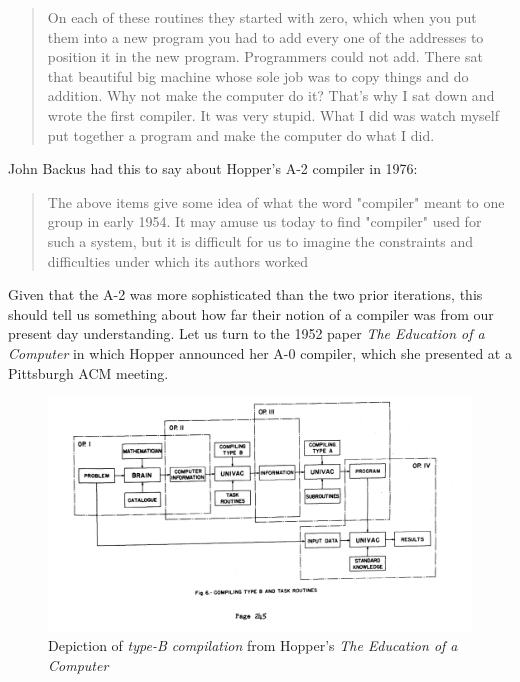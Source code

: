 \begin{quotation}
	On each of these routines they started with zero, which when you put them into
	a new program you had to add every one of the addresses to position it in the
	new program. Programmers could not add.  There sat that beautiful big machine
	whose sole job was to copy things and do addition. Why not make the
	computer do
	it? That's why I sat down and wrote the first compiler. It was very stupid.
	What I did was watch myself put together a program and make the computer do
	what I did.
	\cite{Hopper_1980_Oral_History}
\end{quotation}

John Backus had this to say about Hopper's A-2 compiler in 1976:
\begin{quotation}
	The above items give some idea of what the word "compiler" meant to one
	group in early 1954. It may amuse us today to find "compiler" used for such
	a system, but it is difficult for us to imagine the constraints and
	difficulties
	under which its authors worked
	\cite{Backus_1980_Programming_in_America_in_1950s}
\end{quotation}

Given that the A-2 was more sophisticated than the two prior iterations, this
should tell us something about how far their notion of a compiler was from our
present day understanding. Let us turn to the 1952 paper \textit{The Education
	of a Computer} in which Hopper announced her A-0 compiler, which she presented
at a Pittsburgh ACM meeting\cite{education_of_a_computer_1952_hopper}.

\begin{figure}[h]
	\centering
	\includegraphics[width=.7\textwidth]{resource/gh_education_of_a_computer_type_fig_6.png}
	\caption{Depiction of \textit{type-B compilation} from Hopper's
		\textit{The Education of a Computer}}
	\label{fig:education-of-a-computer-1952-hopper-f6}
\end{figure}

